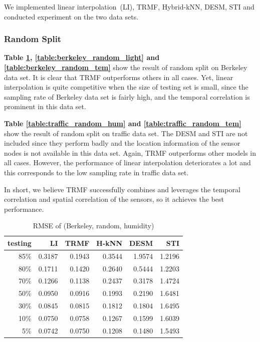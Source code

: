 We implemented linear interpolation~(LI), TRMF, Hybrid-kNN, DESM, STI and conducted experiment on the two data sets.

\subsubsection{Random Split}
\textbf{Table \ref{table:berkeley_random_hum}, \ref{table:berkeley_random_light} and \ref{table:berkeley_random_tem}} show the result of random split on Berkeley data set. It is clear that TRMF outperforms others in all cases. Yet, linear interpolation is quite competitive when the size of testing set is small, since the sampling rate of Berkeley data set is fairly high, and the temporal correlation is prominent in this data set.  

\textbf{Table \ref{table:traffic_random_hum} and \ref{table:traffic_random_tem}} show the result of random split on traffic data set. The DESM and STI are not included since they perform badly and the location information of the sensor nodes is not available in this data set. Again, TRMF outperforms other models in all cases. However, the performance of linear interpolation deteriorates a lot and this corresponds to the low sampling rate in traffic data set. 

In short, we believe TRMF successfully combines and leverages the temporal correlation and spatial correlation of the sensors, so it achieves the best performance. %

\begin{table}[htbp]
\centering
\caption{RMSE of (Berkeley, random, humidity)}
\label{table:berkeley_random_hum}
\begin{tabular}{ r | r r r r r}
	testing	&LI	&TRMF	&H-kNN	&DESM	&STI\\ \hline
	85\%	&0.3187	&0.1943	&0.3544	&1.9574	&1.2196\\ 
	80\%	&0.1711	&0.1420	&0.2640	&0.5444	&1.2203\\
	70\%	&0.1266	&0.1138	&0.2437	&0.3178	&1.4724\\
	50\%	&0.0950	&0.0916	&0.1993	&0.2190	&1.6481\\
	30\%	&0.0845	&0.0815	&0.1812	&0.1804	&1.6495\\
	10\%	&0.0750	&0.0758	&0.1267	&0.1599	&1.6039\\
	 5\%	&0.0742	&0.0750	&0.1208	&0.1480	&1.5493
\end{tabular}
\end{table}

